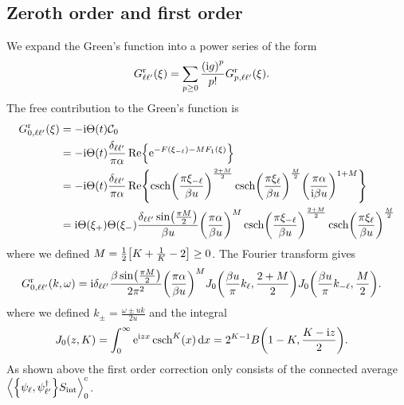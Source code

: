 \documentclass[english, parskip=full]{scrartcl}
\begin{document}
\subsection{Zeroth order and first order}
We expand the Green's function into a power series of the form
\begin{align}
G_{\ell\ell'}^\r(\xi) &= \sum_{p\ge 0} \frac{\kla*{\i g}^p}{p!} G_{p,\ell\ell'}^\r(\xi).
\end{align}
The free contribution to the Green's function is
\begin{align}
G_{0,\ell\ell'}^\r(\xi) &= -\i\Theta(t) \mathcal{C}_0\\
&= -\i\Theta(t) \frac{\delta_{\ell\ell'}}{\pi\alpha} \Re \klc*{\powe{-F(\xi_{-\ell}) - MF_1(\xi)}}\\
&= -\i\Theta(t) \frac{\delta_{\ell\ell'}}{\pi\alpha} \Re \klc*{\csch\kla*{\frac{\pi\xi_{-\ell}}{\beta u}}^\frac{2+M}{2} \csch\kla*{\frac{\pi\xi_\ell}{\beta u}}^\frac{M}{2} \kla*{\frac{\pi\alpha}{\i\beta u}}^{1+M}}\\
&= \i\Theta(\xi_+)\Theta(\xi_-) \frac{\delta_{\ell\ell'} \sin\kla*{\frac{\pi M}{2}}}{\beta u} \kla*{\frac{\pi\alpha}{\beta u}}^{M} \csch\kla*{\frac{\pi\xi_{-\ell}}{\beta u}}^\frac{2+M}{2} \csch\kla*{\frac{\pi\xi_\ell}{\beta u}}^\frac{M}{2}
\end{align}
where we defined $M = \frac{1}{2} \klb*{K + \frac{1}{K} - 2}\ge 0$.
The Fourier transform gives
\begin{align}
G_{0,\ell\ell'}^\r(k,\omega) &= \i \delta_{\ell\ell'} \frac{\beta \sin\kla*{\frac{\pi M}{2}}}{2\pi^2} \kla*{\frac{\pi\alpha}{\beta u}}^{M} J_0\kla*{\frac{\beta u}{\pi} k_\ell, \frac{2 + M}{2}} J_0\kla*{\frac{\beta u}{\pi} k_{-\ell}, \frac{M}{2}}.
\end{align}
where we defined $k_\pm = \frac{\omega \pm uk}{2u}$ and the integral
\begin{align}
J_0(z,K) &= \intx{0}{\infty}{\powe{\i zx} \csch^K(x)}{x} = 2^{K-1} B\kla*{1 - K, \frac{K - \i z}{2}}.
\end{align}
As shown above the first order correction only consists of the connected average $\bra*{\klc*{\psi_\ell, \psi_{\ell'}^\dagger} S_\Text{int}}_0^c$.
\end{document}
